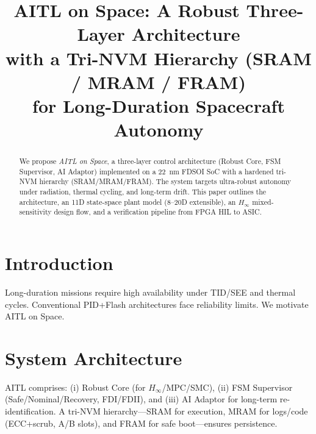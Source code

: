 \documentclass[conference]{IEEEtran}
\title{AITL on Space: A Robust Three-Layer Architecture\\
with a Tri-NVM Hierarchy (SRAM / MRAM / FRAM)\\
for Long-Duration Spacecraft Autonomy}
\author{
\IEEEauthorblockN{Shinichi Samizo}
\IEEEauthorblockA{Independent Semiconductor Researcher\\
Former Engineer at Seiko Epson Corporation\\
Email: \href{mailto:shin3t72@gmail.com}{shin3t72@gmail.com}\quad
GitHub: \url{https://github.com/Samizo-AITL}}
}
\begin{document}
\maketitle

\begin{abstract}
We propose \emph{AITL on Space}, a three-layer control architecture
(Robust Core, FSM Supervisor, AI Adaptor) implemented on a \SI{22}{nm}
FDSOI SoC with a hardened tri-NVM hierarchy (SRAM/MRAM/FRAM).
The system targets ultra-robust autonomy under radiation, thermal cycling,
and long-term drift. This paper outlines the architecture, an 11D
state-space plant model (8--20D extensible), an \mbox{$H_\infty$}
mixed-sensitivity design flow, and a verification pipeline from
FPGA HIL to ASIC.
\end{abstract}

\section{Introduction}
Long-duration missions require high availability under TID/SEE
and thermal cycles. Conventional PID+Flash architectures face
reliability limits. We motivate AITL on Space.

\section{System Architecture}
AITL comprises: (i) Robust Core (for $H_\infty$/MPC/SMC),
(ii) FSM Supervisor (Safe/Nominal/Recovery, FDI/FDI\!I),
and (iii) AI Adaptor for long-term re-identification.
A tri-NVM hierarchy---SRAM for execution, MRAM for logs/code
(ECC+scrub, A/B slots), and FRAM for safe boot---ensures persistence.
\end{document}
